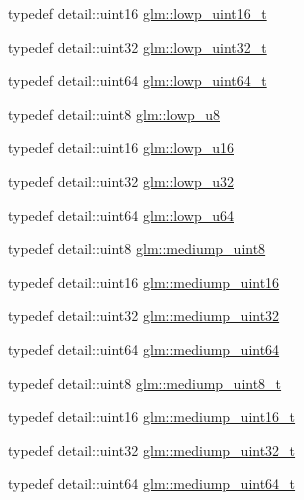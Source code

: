\begin{DoxyCompactItemize}
\item 
typedef detail\+::uint16 \hyperlink{group__gtc__type__precision_ga9a71176a4e5bc61951f9e9197d9c80e1}{glm\+::lowp\+\_\+uint16\+\_\+t}
\item 
typedef detail\+::uint32 \hyperlink{group__gtc__type__precision_ga9f8cb602a358e1f48bda2682cf051f0c}{glm\+::lowp\+\_\+uint32\+\_\+t}
\item 
typedef detail\+::uint64 \hyperlink{group__gtc__type__precision_gabf3069d4f188557a87b1d7f35eb0a270}{glm\+::lowp\+\_\+uint64\+\_\+t}
\item 
typedef detail\+::uint8 \hyperlink{group__gtc__type__precision_gae63f942c49a30dbf266b2f13f3efe257}{glm\+::lowp\+\_\+u8}
\item 
typedef detail\+::uint16 \hyperlink{group__gtc__type__precision_ga22c5364f27caa0a6eb0627cbc21e46be}{glm\+::lowp\+\_\+u16}
\item 
typedef detail\+::uint32 \hyperlink{group__gtc__type__precision_gaba06fae1dd98ca50c017e68345df0365}{glm\+::lowp\+\_\+u32}
\item 
typedef detail\+::uint64 \hyperlink{group__gtc__type__precision_ga61ed4c68a4cffb77cd63cc107119123a}{glm\+::lowp\+\_\+u64}
\item 
typedef detail\+::uint8 \hyperlink{group__gtc__type__precision_gac4b849eaac0543a10f97f4bdda4850a8}{glm\+::mediump\+\_\+uint8}
\item 
typedef detail\+::uint16 \hyperlink{group__gtc__type__precision_ga2cef3a0d7b0fce75c9885f64656d8933}{glm\+::mediump\+\_\+uint16}
\item 
typedef detail\+::uint32 \hyperlink{group__gtc__type__precision_ga861dbd1051f488e425b3966001b568e5}{glm\+::mediump\+\_\+uint32}
\item 
typedef detail\+::uint64 \hyperlink{group__gtc__type__precision_ga6685788d15d0a973ee7c2460d0456dc1}{glm\+::mediump\+\_\+uint64}
\item 
typedef detail\+::uint8 \hyperlink{group__gtc__type__precision_gadfa38f3c245d371c4b2079f1fd68928b}{glm\+::mediump\+\_\+uint8\+\_\+t}
\item 
typedef detail\+::uint16 \hyperlink{group__gtc__type__precision_ga0b385466deac5ac96061ef2cdd6db20f}{glm\+::mediump\+\_\+uint16\+\_\+t}
\item 
typedef detail\+::uint32 \hyperlink{group__gtc__type__precision_gac7782c1e393f9ad47e41a177a685f287}{glm\+::mediump\+\_\+uint32\+\_\+t}
\item 
typedef detail\+::uint64 \hyperlink{group__gtc__type__precision_gaa97354d3120a6dc029a5e9563723de18}{glm\+::mediump\+\_\+uint64\+\_\+t}

\end{DoxyCompactItemize}
